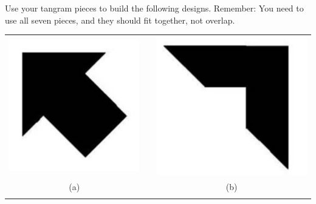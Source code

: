 \begin{problem}
Use your tangram pieces to build the following designs.  Remember: You need to use all seven pieces, and they should fit together, not overlap.


\begin{center}
\begin{tabular}{ccc}
\includegraphics[scale=0.4]{tangram1} & 
\qquad \qquad\qquad& 
\includegraphics[scale=0.4]{tangram2}\\
(a) && (b)\\
\\

\end{tabular}
\end{center}
\end{problem}
